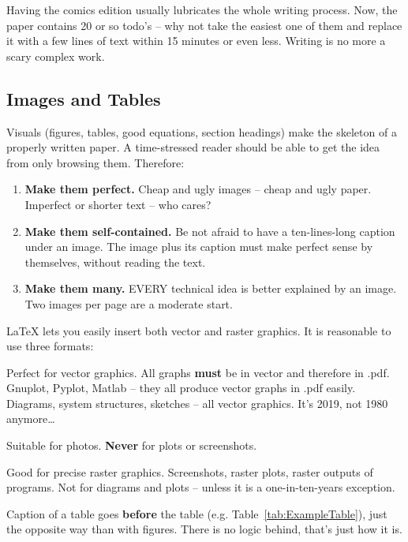 Having the comics edition usually lubricates the whole writing process.  Now, the paper contains 20 or so todo's -- why not take the easiest one of them and replace it with a few lines of text within 15 minutes or even less.  Writing is no more a scary complex work.

\subsection{Images and Tables}
\label{sec:Images}

Visuals (figures, tables, good equations, section headings) make the skeleton of a properly written paper.  A time-stressed reader should be able to get the idea from only browsing them.  
Therefore:
\begin{enumerate}[noitemsep]
\item \textbf{Make them perfect.}  Cheap and ugly images -- cheap and ugly paper.  Imperfect or shorter text -- who cares?
\item \textbf{Make them self-contained.}  Be not afraid to have a ten-lines-long caption under an image.  The image plus its caption must make perfect sense by themselves, without reading the text.
\item \textbf{Make them many.}  EVERY technical idea is better explained by an image.  Two images per page are a moderate start.
\end{enumerate}
\LaTeX{} lets you easily insert both vector and raster graphics. It is reasonable to use three formats:
\begin{description}[noitemsep]
\item[.pdf] Perfect for vector graphics.  All graphs \textbf{must} be in vector and therefore in .pdf.  Gnuplot, Pyplot, Matlab -- they all produce vector graphs in .pdf easily.  Diagrams, system structures, sketches -- all vector graphics.  It's 2019, not 1980 anymore\ldots
\item[.jpg] Suitable for photos.  \textbf{Never} for plots or screenshots.
\item[.png] Good for precise raster graphics.  Screenshots, raster plots, raster outputs of programs.  Not for diagrams and plots -- unless it is a one-in-ten-years exception.
\end{description}
Caption of a table goes \textbf{before} the table (e.g. Table~\ref{tab:ExampleTable}), just the opposite way than with figures.  There is no logic behind, that's just how it is.

